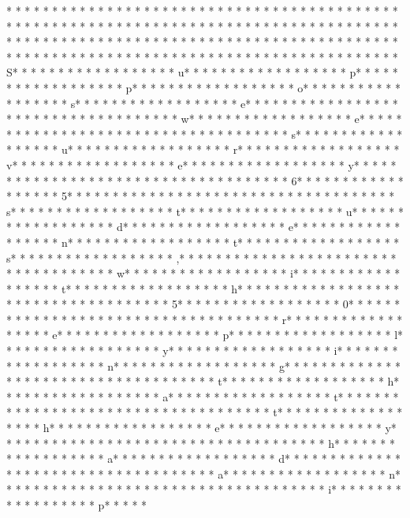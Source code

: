 * * *  * * *  * * *  *  * * *  *  * * *  * * *  * * *  *  * * *  *  * * *  * * *  * * *  *  * * *  *  * * *  *  * * *  * * *  * * *  *  * * *  *  * * *  *  * * *  * * *  * * *  *  * * *  *  * * *  *  * * *  * * *  * * *  *  * * *  *  * * *  *  * * *  * * *  * * *  *  * * *  *  * * *  *  * * *  * * *  * * *  *  * * *  *  * * *  *  * * *  * * *  * * *  *  * * *  *  * * *  *  * * *  * * *  * * *  *  * * *  *  * * *  * S* * *  * * *  * * *  *  * * *  *  * * *  * u* * *  * * *  * * *  *  * * *  *  * * *  * p* * *  * * *  * * *  *  * * *  *  * * *  * p* * *  * * *  * * *  *  * * *  *  * * *  * o* * *  * * *  * * *  *  * * *  *  * * *  * s* * *  * * *  * * *  *  * * *  *  * * *  * e* * *  * * *  * * *  *  * * *  *  * * *  *  * * *  * * *  * * *  *  * * *  *  * * *  * w* * *  * * *  * * *  *  * * *  *  * * *  * e* * *  * * *  * * *  *  * * *  *  * * *  *  * * *  * * *  * * *  *  * * *  *  * * *  * s* * *  * * *  * * *  *  * * *  *  * * *  * u* * *  * * *  * * *  *  * * *  *  * * *  * r* * *  * * *  * * *  *  * * *  *  * * *  * v* * *  * * *  * * *  *  * * *  *  * * *  * e* * *  * * *  * * *  *  * * *  *  * * *  * y* * *  * * *  * * *  *  * * *  *  * * *  *  * * *  * * *  * * *  *  * * *  *  * * *  * 6* * *  * * *  * * *  *  * * *  *  * * *  * 5* * *  * * *  * * *  *  * * *  *  * * *  *  * * *  * * *  * * *  *  * * *  *  * * *  * s* * *  * * *  * * *  *  * * *  *  * * *  * t* * *  * * *  * * *  *  * * *  *  * * *  * u* * *  * * *  * * *  *  * * *  *  * * *  * d* * *  * * *  * * *  *  * * *  *  * * *  * e* * *  * * *  * * *  *  * * *  *  * * *  * n* * *  * * *  * * *  *  * * *  *  * * *  * t* * *  * * *  * * *  *  * * *  *  * * *  * s* * *  * * *  * * *  *  * * *  *  * * *  * ,* * *  * * *  * * *  *  * * *  *  * * *  *  * * *  * * *  * * *  *  * * *  *  * * *  * w* * *  * * *  * * *  *  * * *  *  * * *  * i* * *  * * *  * * *  *  * * *  *  * * *  * t* * *  * * *  * * *  *  * * *  *  * * *  * h* * *  * * *  * * *  *  * * *  *  * * *  *  * * *  * * *  * * *  *  * * *  *  * * *  * 5* * *  * * *  * * *  *  * * *  *  * * *  * 0* * *  * * *  * * *  *  * * *  *  * * *  *  * * *  * * *  * * *  *  * * *  *  * * *  * r* * *  * * *  * * *  *  * * *  *  * * *  * e* * *  * * *  * * *  *  * * *  *  * * *  * p* * *  * * *  * * *  *  * * *  *  * * *  * l* * *  * * *  * * *  *  * * *  *  * * *  * y* * *  * * *  * * *  *  * * *  *  * * *  * i* * *  * * *  * * *  *  * * *  *  * * *  * n* * *  * * *  * * *  *  * * *  *  * * *  * g* * *  * * *  * * *  *  * * *  *  * * *  *  * * *  * * *  * * *  *  * * *  *  * * *  * t* * *  * * *  * * *  *  * * *  *  * * *  * h* * *  * * *  * * *  *  * * *  *  * * *  * a* * *  * * *  * * *  *  * * *  *  * * *  * t* * *  * * *  * * *  *  * * *  *  * * *  *  * * *  * * *  * * *  *  * * *  *  * * *  * t* * *  * * *  * * *  *  * * *  *  * * *  * h* * *  * * *  * * *  *  * * *  *  * * *  * e* * *  * * *  * * *  *  * * *  *  * * *  * y* * *  * * *  * * *  *  * * *  *  * * *  *  * * *  * * *  * * *  *  * * *  *  * * *  * h* * *  * * *  * * *  *  * * *  *  * * *  * a* * *  * * *  * * *  *  * * *  *  * * *  * d* * *  * * *  * * *  *  * * *  *  * * *  *  * * *  * * *  * * *  *  * * *  *  * * *  * a* * *  * * *  * * *  *  * * *  *  * * *  * n* * *  * * *  * * *  *  * * *  *  * * *  *  * * *  * * *  * * *  *  * * *  *  * * *  * i* * *  * * *  * * *  *  * * *  *  * * *  * p* * *  * * 